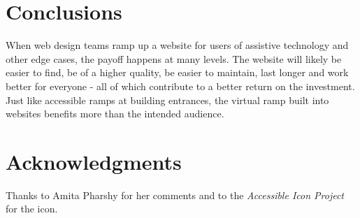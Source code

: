 \documentclass{acm_proc_article-sp}
\begin{document}
\section{Conclusions}
When web design teams ramp up a website for users of assistive technology and other edge cases, the payoff happens at many levels. The website will likely be easier to find, be of a higher quality, be easier to maintain, last longer and work better for everyone - all of which contribute to a better return on the investment. Just like accessible ramps at building entrances, the virtual ramp built into websites benefits more than the intended audience.

\section{Acknowledgments}
Thanks to Amita Pharshy for her comments and to the {\it Accessible Icon Project} for the icon.

\end{document}

